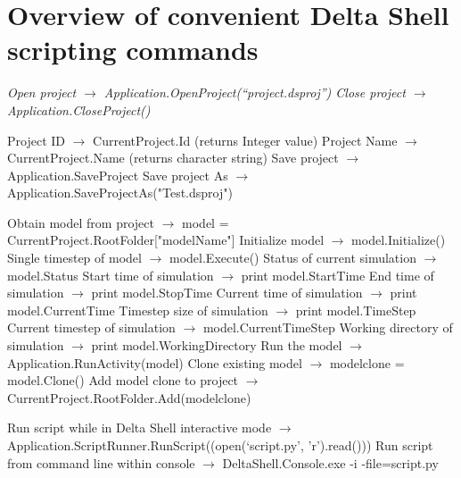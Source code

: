 
\chapter{Overview of convenient Delta Shell scripting commands}\label{appendixb}
\sl
Open project $\rightarrow$ Application.OpenProject(“project.dsproj”) \newline
Close project $\rightarrow$ Application.CloseProject()

Project ID $\rightarrow$ CurrentProject.Id (returns Integer value) \newline
Project Name $\rightarrow$ CurrentProject.Name (returns character string) \newline
Save project $\rightarrow$ Application.SaveProject \newline
Save project As $\rightarrow$ Application.SaveProjectAs("Test.dsproj")

Obtain model from project $\rightarrow$ model = CurrentProject.RootFolder["modelName"] \newline
Initialize model $\rightarrow$ model.Initialize() \newline
Single timestep of model $\rightarrow$ model.Execute() \newline
Status of current simulation $\rightarrow$ model.Status \newline
Start time of simulation $\rightarrow$ print model.StartTime \newline
End time of simulation $\rightarrow$ print model.StopTime \newline
Current time of simulation $\rightarrow$ print model.CurrentTime \newline
Timestep size of simulation $\rightarrow$ print model.TimeStep \newline
Current timestep of simulation $\rightarrow$ model.CurrentTimeStep \newline
Working directory of simulation $\rightarrow$ print model.WorkingDirectory \newline
Run the model $\rightarrow$ Application.RunActivity(model)
Clone existing model $\rightarrow$ modelclone = model.Clone()
Add model clone to project $\rightarrow$ CurrentProject.RootFolder.Add(modelclone)

Run script while in Delta Shell interactive mode $\rightarrow$ Application.ScriptRunner.RunScript((open(‘script.py’, 'r').read())) \newline
Run script from command line within console $\rightarrow$ DeltaShell.Console.exe -i -file=script.py
